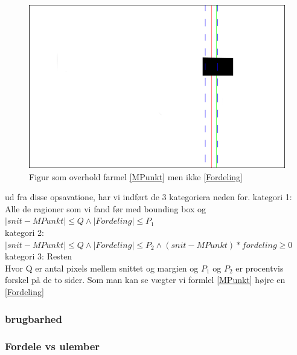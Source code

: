 {\begin{figure}[h]
	\begin{center}
		\includegraphics[scale=0.5,angle=0]{afsnit/vores_implementation/billeder/udvidet_loesning/dontwork2.png}
	\end{center}
	\caption[]{Figur som overhold farmel \ref{MPunkt} men ikke \ref{Fordeling}}
	\label{dontwork2}
\end{figure}

ud fra disse opsavatione, har vi indført de 3 kategoriera neden for.
kategori 1: Alle de ragioner som vi fand før med bounding box og $ |snit - MPunkt| \leq Q \wedge |Fordeling| \leq P_1$ \\
kategori 2: $|snit - MPunkt| \leq Q \wedge |Fordeling| \leq P_2 \wedge (snit - MPunkt)*fordeling \geq 0$ \\
kategori 3: Resten\\

Hvor Q er antal pixels mellem snittet og margien og $P_1$ og $P_2$ er procentvis forskel på de to sider.
Som man kan se vægter vi formlel \ref{MPunkt} højre en \ref{Fordeling}


\subsubsection*{brugbarhed}
\subsubsection*{Fordele vs ulember}

}

